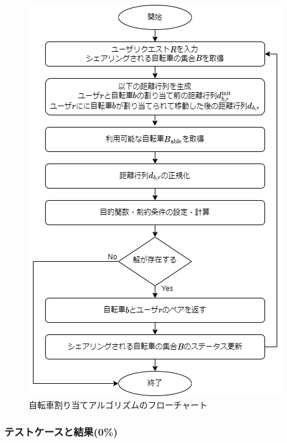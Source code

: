           \begin{figure}[htbp]
            \centering
            \includegraphics[scale=0.54]
            {figures/algorithmImplementation.png}
            \caption{自転車割り当てアルゴリズムのフローチャート}
            \label{fig:自転車割り当てアルゴリズムのフローチャート}
          \end{figure}

      \subsubsection{テストケースと結果(0\%)}
        \label{sec:テストケースと結果}
          \par
          

